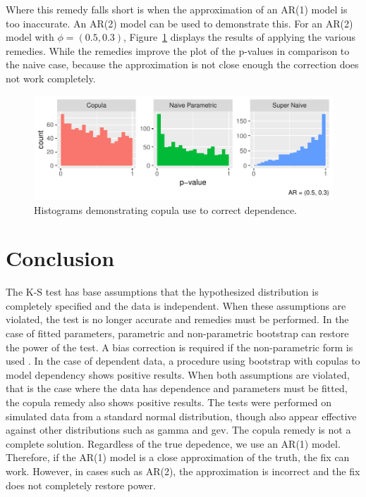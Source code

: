 \documentclass[12pt, letterpaper, titlepage]{article}
\begin{document}
Where this remedy falls short is when the approximation of an AR(1) model is too inaccurate.
An AR(2) model can be used to demonstrate this. For an AR(2) model with $\phi = (0.5, 0.3)$,
Figure~\ref{fig:hist_copula_ar2} displays the results of applying the various remedies. 
While the remedies improve the plot of the p-values in comparison to the naive case,
because the approximation is not close enough the correction does not work completely.

\begin{figure}[tbp]
  \centering
  \includegraphics{hist_copula_ar2}
  \caption{Histograms demonstrating copula use to correct dependence.}
  \label{fig:hist_copula_ar2}
\end{figure}

\hypertarget{sec:conclusion}{%
\section{Conclusion}\label{sec:conclusion}}

The K-S test has base assumptions that the hypothesized distribution is completely specified
and the data is independent. When these assumptions are violated, the test is no
longer accurate and remedies must be performed. In the case of fitted parameters, 
parametric and non-parametric bootstrap can restore the power of the test. A bias 
correction is required if the non-parametric form is used \citep{Babu}. In the case of dependent
data, a procedure using bootstrap with copulas to model dependency shows positive results.
When both assumptions are violated, that is the case where the data has dependence and 
parameters must be fitted, the copula remedy also shows positive results. The tests were 
performed on simulated data from a standard normal distribution, though also appear effective
against other distributions such as gamma and gev. The copula remedy
is not a complete solution. Regardless of the true depedence, we use an AR(1) model.
Therefore, if the AR(1) model is a close approximation of the truth, the fix can work.
However, in cases such as AR(2), the approximation is incorrect and the fix does not 
completely restore power.




\end{document}
